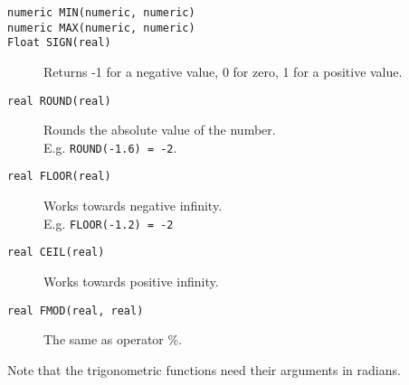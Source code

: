 \begin{description}
  \item[ \texttt{numeric MIN(numeric, numeric)}]
  \item[ \texttt{numeric MAX(numeric, numeric)}]
  \item[ \texttt{Float SIGN(real)}]
       Returns -1 for a negative value, 0 for zero, 1 for a positive value.
  \item[ \texttt{real ROUND(real)}]
       Rounds the absolute value of the number.
       \\E.g. \texttt{ROUND(-1.6) = -2}.
  \item[ \texttt{real FLOOR(real)}]
       Works towards negative infinity.
       \\E.g. \texttt{FLOOR(-1.2) = -2}
  \item[ \texttt{real CEIL(real)}] Works towards positive infinity.
  \item[ \texttt{real FMOD(real, real)}] The same as operator \%.
\end{description}
Note that the trigonometric functions need their arguments in radians.

